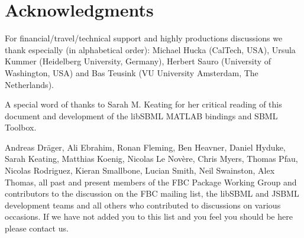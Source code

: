 
\section{Acknowledgments}


For financial/travel/technical support and highly productions discussions we thank especially (in alphabetical order): Michael Hucka (CalTech, USA), Ursula Kummer (Heidelberg University, Germany), Herbert Sauro (University of Washington, USA) and Bas Teusink (VU University Amsterdam, The Netherlands).

A special word of thanks to Sarah M. Keating for her critical reading of this document and development of the \textsf{libSBML} \textsf{MATLAB} bindings and \textsf{SBML Toolbox}.

 Andreas Dr\"{a}ger, Ali Ebrahim, Ronan Fleming, Ben Heavner, Daniel Hyduke, Sarah Keating, Matthias Koenig, Nicolas Le Nov\`{e}re, Chris Myers, Thomas Pfau, Nicolas Rodriguez, Kieran Smallbone, Lucian Smith, Neil Swainston, Alex Thomas, all past and present members of the \textsf{FBC Package Working Group} and contributors to the discussion on the \textsf{FBC mailing list}, the libSBML and JSBML development teams and all others who contributed to discussions on various occasions. If we have not added you to this list and you feel you should be here please contact us.

